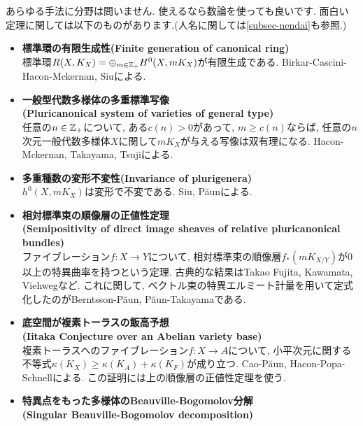 あらゆる手法に分野は問いません. 使えるなら数論を使っても良いです. 
面白い定理に関しては以下のものがあります.(人名に関しては\ref{subsec-nendai}も参照.)
\begin{itemize}[left=0pt]
  \setlength{\parskip}{0cm} %
  \setlength{\itemsep}{5pt} %
  \item \textbf{標準環の有限生成性(Finite generation of canonical ring)} \\ 標準環$R(X, K_X)= \oplus_{m \in \mathbb{Z}_+} H^0 (X, mK_X)$が有限生成である. Birkar-Cascini-Hacon-Mckernan, Siuによる.  
  \item \textbf{一般型代数多様体の多重標準写像 \\ (Pluricanonical system of varieties of general type)} \\
  任意の$n \in \mathbb{Z}_+$について, ある$c(n) >0$があって, $m \ge c(n)$ならば, 任意の$n$次元一般代数多様体$X$に関して$m K_{X}$が与える写像は双有理になる. Hacon-Mckernan, Takayama, Tsujiによる. 
  \item \textbf{多重種数の変形不変性(Invariance of plurigenera)} \\
  $h^0(X,mK_{X})$は変形で不変である. Siu, Păunによる. 
\item \textbf{相対標準束の順像層の正値性定理 \\ (Semipositivity of direct image sheaves of relative pluricanonical bundles)} \\
ファイブレーション$f : X \to Y$について, 相対標準束の順像層$f_{*}(mK_{X/Y})$が0以上の特異曲率を持つという定理. 古典的な結果はTakao Fujita, Kawamata, Viehwegなど. これに関して, ベクトル束の特異エルミート計量を用いて定式化したのがBerntsson-P\u{a}un, P\u{a}un-Takayamaである. %
\item \textbf{底空間が複素トーラスの飯高予想\\ (Iitaka Conjecture over an Abelian variety base)} \\
複素トーラスへのファイブレーション$f : X \to A$について, 小平次元に関する不等式$\kappa(K_X) \ge \kappa(K_A) + \kappa(K_F)$が成り立つ. Cao-Păun, Hacon-Popa-Schnellによる. この証明には上の順像層の正値性定理を使う. 
\item \textbf{特異点をもった多様体のBeauville-Bogomolov分解 \\ (Singular Beauville-Bogomolov decomposition)}\\

\end{itemize}
